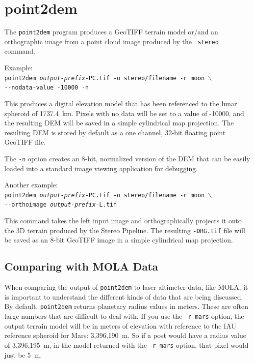 
\section{point2dem}
\label{point2dem}

The \texttt{point2dem} program produces a GeoTIFF terrain model or/and
an orthographic image from a point cloud image produced by the {\tt
  stereo} command.

Example:\\
\hspace*{2em}\texttt{point2dem \textit{output-prefix}-PC.tif -o stereo/filename -r moon $\backslash$} \\
\hspace*{4em}\texttt{-\/-nodata-value -10000 -n}

This produces a digital elevation model that has been referenced to
the lunar spheroid of 1737.4~km.  Pixels with no data will be set to a
value of -10000, and the resulting \ac{DEM} will be saved in a simple
cylindrical map projection.  The resulting \ac{DEM} is stored by default as
a one channel, 32-bit floating point GeoTIFF file.

The {\tt -n} option creates an 8-bit, normalized version of the DEM
that can be easily loaded into a standard image viewing application
for debugging.

Another example: \\
\hspace*{2em}\texttt{point2dem \textit{output-prefix}-PC.tif -o stereo/filename -r moon $\backslash$} \\
\hspace*{4em}\texttt{-\/-orthoimage \textit{output-prefix}-L.tif}

This command takes the left input image and orthographically projects
it onto the 3D terrain produced by the Stereo Pipeline.  The resulting
{\tt *-DRG.tif} file will be saved as an 8-bit GeoTIFF image in a
simple cylindrical map projection.

\subsection{Comparing with MOLA Data}

When comparing the output of \texttt{point2dem} to laser altimeter
data, like MOLA, it is important to understand the different kinds
of data that are being discussed.  By default, \texttt{point2dem}
returns planetary radius values in meters.  These are often large
numbers that are difficult to deal with.  If you use the \texttt{-r
mars} option, the output terrain model will be in meters of elevation
with reference to the IAU reference spheroid for Mars: 3,396,190~m.
So if a post would have a radius value of 3,396,195~m, in the model
returned with the \texttt{-r mars} option, that pixel would just be 5~m.


